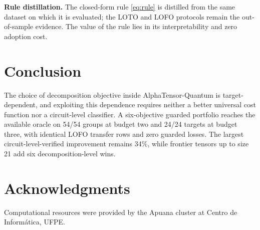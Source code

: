 \documentclass{cbctq}
\begin{document}
\textbf{Rule distillation.} The closed-form rule \eqref{eq:rule} is distilled from the same dataset on which it is evaluated; the LOTO and LOFO protocols remain the out-of-sample evidence. The value of the rule lies in its interpretability and zero adoption cost.

\section{Conclusion}

The choice of decomposition objective inside AlphaTensor-Quantum is target-dependent, and exploiting this dependence requires neither a better universal cost function nor a circuit-level classifier. A six-objective guarded portfolio reaches the available oracle on 54/54 groups at budget two and 24/24 targets at budget three, with identical LOFO transfer rows and zero guarded losses. The largest circuit-level-verified improvement remains 34\%, while frontier tensors up to size 21 add six decomposition-level wins.

\section*{Acknowledgments}

Computational resources were provided by the Apuana cluster at Centro de Inform\'atica, UFPE.
\end{document}
